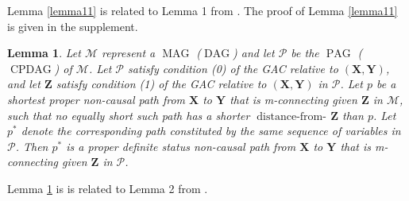 \documentclass[]{article}
\DeclareMathOperator{\CPDAG}{CPDAG}
\DeclareMathOperator{\DAG}{DAG}
\DeclareMathOperator{\MAG}{MAG}
\DeclareMathOperator{\PAG}{PAG}
\DeclareMathOperator{\distancefrom}{distance-from-\!}
\newtheorem{lemma}[theorem]{Lemma}
\theoremstyle{definition}
\theoremstyle{remark}
\newcommand{\g}[1][G]{\mathcal{#1}}
\newcommand{\pstar}[1][p]{{#1}^{*}}
\begin{document}
 Lemma \ref{lemma11} is related to Lemma 1 from \citet{zhang2006causal}. The proof of Lemma \ref{lemma11} is given in the supplement.

\begin{lemma}
   Let $\g[M]$ represent a $\MAG$ ($\DAG$) and let $\g[P]$ be the $\PAG$ ($\CPDAG$) of $\g[M]$. Let $\g[P]$ satisfy condition (0) of the GAC relative to $(\mathbf{X},\mathbf{Y})$, and let $\mathbf{Z}$ satisfy condition (1) of the GAC relative to $(\mathbf{X},\mathbf{Y})$ in $\g[P]$. Let $p$ be a shortest proper non-causal path from $\mathbf{X}$ to $\mathbf{Y}$ that is m-connecting given $\mathbf{Z}$ in $\g[M]$, such that no equally short such path has a shorter $\distancefrom{\mathbf{Z}}$ than $p$. Let $\pstar$ denote the corresponding path constituted by the same sequence of variables in $\g[P]$. Then $\pstar$ is a proper definite status non-causal path from $\mathbf{X}$ to $\mathbf{Y}$ that is m-connecting given $\mathbf{Z}$ in $\g[P]$. 
   \label{lemma22}
\end{lemma}

Lemma \ref{lemma22} is is related to Lemma 2 from \citet{zhang2006causal}.
\end{document}
